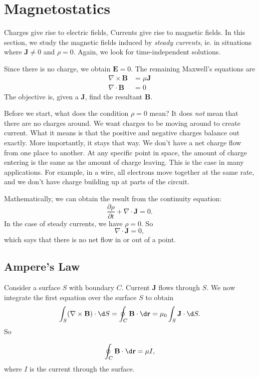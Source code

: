 \documentclass[a4paper]{article}
\begin{document}
\section{Magnetostatics}
Charges give rise to electric fields, Currents give rise to magnetic fields. In this section, we study the magnetic fields induced by \emph{steady currents}, ie. in situations where $\mathbf{J}\not= 0$ and $\rho = 0$. Again, we look for time-independent solutions.

Since there is no charge, we obtain $\mathbf{E} = 0$. The remaining Maxwell's equations are
\begin{align*}
  \nabla \times \mathbf{B} &= \mu \mathbf{J}\\
  \nabla\cdot \mathbf{B} &= 0
\end{align*}
The objective is, given a $\mathbf{J}$, find the resultant $\mathbf{B}$.

Before we start, what does the condition $\rho = 0$ mean? It does \emph{not} mean that there are no charges around. We want charges to be moving around to create current. What it means is that the positive and negative charges balance out exactly. More importantly, it stays that way. We don't have a net charge flow from one place to another. At any specific point in space, the amount of charge entering is the same as the amount of charge leaving. This is the case in many applications. For example, in a wire, all electrons move together at the same rate, and we don't have charge building up at parts of the circuit.

Mathematically, we can obtain the result from the continuity equation:
\[
  \frac{\partial\rho}{\partial t} + \nabla \cdot \mathbf{J} = 0.
\]
In the case of steady currents, we have $\rho = 0$. So
\[
  \nabla\cdot \mathbf{J} = 0,
\]
which says that there is no net flow in or out of a point.
\subsection{Ampere's Law}
Consider a surface $S$ with boundary $C$. Current $\mathbf{J}$ flows through $S$. We now integrate the first equation over the surface $S$ to obtain
\[
  \int_S (\nabla\times \mathbf{B})\cdot \d S = \oint_C \mathbf{B}\cdot \d \mathbf{r} = \mu_0 \int_S \mathbf{J}\cdot \d S.
\]
So
\begin{law}
  \[
    \oint_C \mathbf{B}\cdot \d \mathbf{r} = \mu I,
  \]
  where $I$ is the current through the surface.
\end{law}
\end{document}
